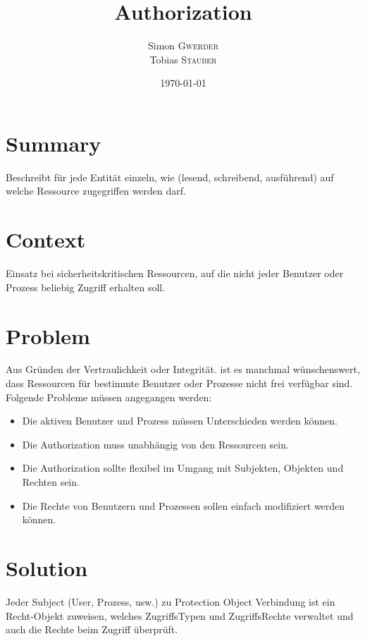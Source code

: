 \documentclass{article}
\title{Authorization} %
\author{Simon \textsc{Gwerder}\\Tobias \textsc{Stauber}} %
\date{\today} %
\begin{document}
	
	\maketitle %
	
	
	\section{Summary}
	Beschreibt für jede Entität einzeln, wie (lesend, schreibend, ausführend) auf welche Ressource zugegriffen werden darf.
	
	\section{Context}
	Einsatz bei sicherheitskritischen Ressourcen, auf die nicht jeder Benutzer oder Prozess beliebig Zugriff erhalten soll.
	
	\section{Problem}
	Aus Gründen der Vertraulichkeit oder Integrität. ist es manchmal wünschenswert, dass Ressourcen für bestimmte Benutzer oder Prozesse nicht frei verfügbar sind. Folgende Probleme müssen angegangen werden:\\
	\begin{itemize}{}{ }
		\item Die aktiven Benutzer und Prozess müssen Unterschieden werden können.
		\item Die Authorization muss unabhängig von den Ressourcen sein.
		\item Die Authorization sollte flexibel im Umgang mit Subjekten, Objekten und Rechten sein.
		\item Die Rechte von Benutzern und Prozessen sollen einfach modifiziert werden können.
	\end{itemize}

\section{Solution}
Jeder Subject (User, Prozess, usw.) zu Protection Object Verbindung ist ein Recht-Objekt zuweisen, welches ZugriffsTypen und ZugriffsRechte verwaltet und auch die Rechte beim Zugriff überprüft.
\end{document}
